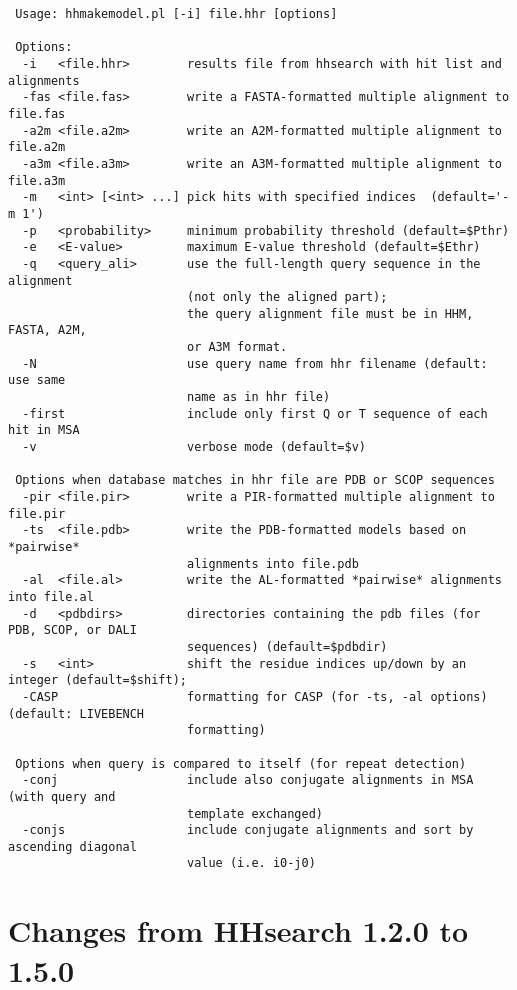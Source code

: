 \documentclass[11pt,a4paper]{article}
\begin{document}
\small \begin{verbatim}
 Usage: hhmakemodel.pl [-i] file.hhr [options]

 Options:
  -i   <file.hhr>        results file from hhsearch with hit list and alignments
  -fas <file.fas>        write a FASTA-formatted multiple alignment to file.fas
  -a2m <file.a2m>        write an A2M-formatted multiple alignment to file.a2m
  -a3m <file.a3m>        write an A3M-formatted multiple alignment to file.a3m
  -m   <int> [<int> ...] pick hits with specified indices  (default='-m 1')
  -p   <probability>     minimum probability threshold (default=$Pthr)        
  -e   <E-value>         maximum E-value threshold (default=$Ethr)        
  -q   <query_ali>       use the full-length query sequence in the alignment 
                         (not only the aligned part);
                         the query alignment file must be in HHM, FASTA, A2M,  
                         or A3M format.
  -N                     use query name from hhr filename (default: use same  
                         name as in hhr file)
  -first                 include only first Q or T sequence of each hit in MSA
  -v                     verbose mode (default=$v)

 Options when database matches in hhr file are PDB or SCOP sequences
  -pir <file.pir>        write a PIR-formatted multiple alignment to file.pir 
  -ts  <file.pdb>        write the PDB-formatted models based on *pairwise*  
                         alignments into file.pdb
  -al  <file.al>         write the AL-formatted *pairwise* alignments into file.al
  -d   <pdbdirs>         directories containing the pdb files (for PDB, SCOP, or DALI  
                         sequences) (default=$pdbdir)
  -s   <int>             shift the residue indices up/down by an integer (default=$shift);           
  -CASP                  formatting for CASP (for -ts, -al options) (default: LIVEBENCH  
                         formatting)

 Options when query is compared to itself (for repeat detection) 
  -conj                  include also conjugate alignments in MSA (with query and  
                         template exchanged) 
  -conjs                 include conjugate alignments and sort by ascending diagonal  
                         value (i.e. i0-j0)
\end{verbatim} \normalsize



\section{Changes from HHsearch 1.2.0 to 1.5.0}
\end{document}
